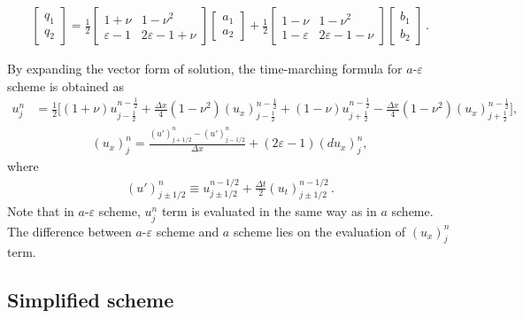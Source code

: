 \documentclass[11pt,dvips]{article}
\numberwithin{equation}{section}
\begin{document}
\begin{align*}
  \left[\begin{array}{c} q_1 \\ q_2 \end{array}\right]
    = \frac{1}{2}\left[\begin{array}{cc} 1+\nu & 1-\nu^2 \\
      \varepsilon-1 & 2\varepsilon-1+\nu \end{array}\right]
      \left[\begin{array}{c} a_1 \\ a_2 \end{array}\right]
    + \frac{1}{2}\left[\begin{array}{cc} 1-\nu & 1-\nu^2 \\
      1-\varepsilon & 2\varepsilon - 1 - \nu \end{array}\right]
  \left[\begin{array}{c} b_1 \\ b_2 \end{array}\right]\,.
\end{align*}

By expanding the vector form of solution, the time-marching formula for
$a$-$\varepsilon$ scheme is obtained as
\begin{align}
  u_j^n &= \frac{1}{2}\Big[
      (1+\nu)u_{j-\frac{1}{2}}^{n-\frac{1}{2}}
    + \frac{\Delta x}{4}(1-\nu^2)(u_x)_{j-\frac{1}{2}}^{n-\frac{1}{2}}
    + (1-\nu)u_{j+\frac{1}{2}}^{n-\frac{1}{2}}
    - \frac{\Delta x}{4}(1-\nu^2)(u_x)_{j+\frac{1}{2}}^{n-\frac{1}{2}}
  \Big], \label{e:aeu}
\end{align}
\begin{align}
  (u_x)_j^n = \frac{(u')_{j+1/2}^n - (u')_{j-1/2}^n}{\Delta x}
            + (2\varepsilon-1)(du_x)_j^n, \label{e:aeux}
\end{align}
where
\begin{align*}
  (u')_{j\pm1/2}^n \equiv
    u_{j\pm1/2}^{n-1/2}+\frac{\Delta t}{2}(u_t)_{j\pm1/2}^{n-1/2}\,.
\end{align*}
Note that in $a$-$\varepsilon$ scheme, $u_j^n$ term is evaluated in the same
way as in $a$ scheme.  The difference between $a$-$\varepsilon$ scheme and $a$
scheme lies on the evaluation of $(u_x)_j^n$ term.

\subsection{Simplified scheme}
\end{document}
